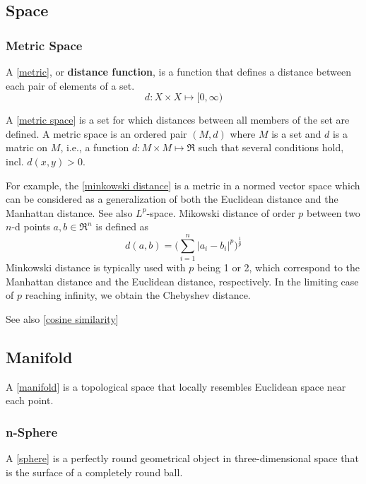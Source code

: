 \subsection{Space}

\subsubsection{Metric Space}

A [\href{https://en.wikipedia.org/wiki/Metric_(mathematics)}{metric}], or
{\bf distance function}, is a function that defines a distance between
each pair of elements of a set.
$$d: X \times X \mapsto [0, \infty)$$

A [\href{https://en.wikipedia.org/wiki/Metric_space}{metric space}]
is a set for which distances between all members of the set are defined.
A metric space is an ordered pair $(M,d)$ where $M$ is a set and $d$ is
a matric on $M$, i.e., a function $d:M\times M\mapsto \Re$ such that
several conditions hold, incl. $d(x,y)>0$.

For example, the [\href{https://en.wikipedia.org/wiki/Minkowski_distance}{minkowski distance}]
is a metric in a normed vector space which can be considered as a
generalization of both the Euclidean distance and the Manhattan distance.
See also $L^p$-space. Mikowski distance of order $p$ between two $n$-d points
$a,b\in\Re^n$ is defined as
$$d(a, b) = \Big( \sum_{i=1}^n |a_i - b_i|^p \Big)^{\frac{1}{p}}$$
Minkowski distance is typically used with $p$ being 1 or 2, which correspond
to the Manhattan distance and the Euclidean distance, respectively. In the
limiting case of $p$ reaching infinity, we obtain the Chebyshev distance.

See also [\href{https://en.wikipedia.org/wiki/Cosine_similarity}{cosine similarity}]

\subsection{Manifold}

A [\href{https://en.wikipedia.org/wiki/Manifold}{manifold}] is a topological
space that locally resembles Euclidean space near each point.

\subsubsection{n-Sphere}

A [\href{https://en.wikipedia.org/wiki/Sphere}{sphere}] is a perfectly round
geometrical object in three-dimensional space that is the surface of a
completely round ball.

